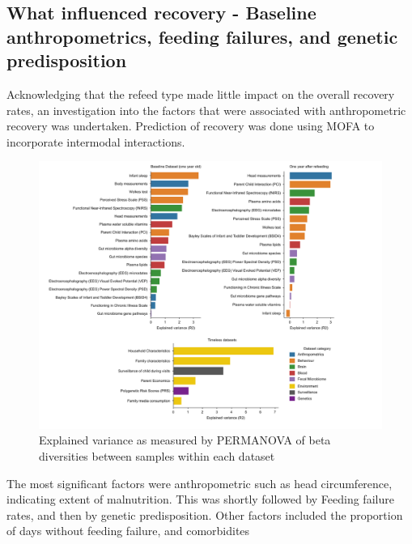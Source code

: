 \documentclass{article}
\begin{document}
\subsection*{What influenced recovery - Baseline anthropometrics, feeding failures, and genetic predisposition}
Acknowledging that the refeed type made little impact on the overall recovery rates, an investigation into the factors that were associated with anthropometric recovery was undertaken.
Prediction of recovery was done using MOFA to incorporate intermodal interactions.
\begin{figure}[H]
	\centering
	\includegraphics[scale=0.6]{figures/ev}
	\caption[Factors that associate with recovery]{
		Explained variance as measured by PERMANOVA of beta diversities between samples within each dataset
	}
\label{fig:Figure2}
\end{figure}

The most significant factors were anthropometric such as head circumference, indicating extent of malnutrition.
This was shortly followed by Feeding failure rates, and then by genetic predisposition.
Other factors included the proportion of days without feeding failure, and comorbidites
\end{document}
